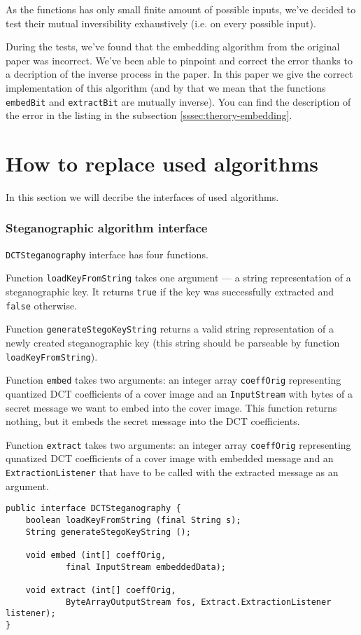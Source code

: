 As the functions has only small finite amount of possible inputs, we've decided
to test their mutual inversibility exhaustively (i.e. on every possible input).

During the tests, we've found that the embedding algorithm from the original
paper \cite{liu2008high} was incorrect. We've been able to pinpoint and correct
the error thanks to a decription of the inverse process in the paper. In this 
paper we give the correct implementation of this algorithm (and by that we mean
that the functions \texttt{embedBit} and \texttt{extractBit} are mutually inverse).
You can find the description of the error in the listing in the subsection \ref{sssec:therory-embedding}.

\section{How to replace used algorithms}
In this section we will decribe the interfaces of used algorithms.

\subsubsection{Steganographic algorithm interface}
\texttt{DCTSteganography} interface has four functions.

Function \texttt{loadKeyFromString} takes one argument --- 
a string representation of a steganographic key. It returns
\texttt{true} if the key was successfully extracted and
\texttt{false} otherwise.

Function \texttt{generateStegoKeyString} returns a 
valid string representation of a newly created steganographic key 
(this string should be parseable by function \texttt{loadKeyFromString}).

Function \texttt{embed} takes two arguments: an integer array \texttt{coeffOrig}
representing quantized DCT coefficients of a cover image and an \texttt{InputStream} 
with bytes of a secret message we want to embed into the cover image. 
This function returns nothing, but it embeds the secret message into
the DCT coefficients. 

Function \texttt{extract} takes two arguments: an integer array \texttt{coeffOrig}
representing qunatized DCT coefficients of a cover image with embedded message
and an \texttt{ExtractionListener} that have to be called with the extracted message
as an argument.

\begin{lstlisting} 
public interface DCTSteganography {
    boolean loadKeyFromString (final String s);
    String generateStegoKeyString ();

    void embed (int[] coeffOrig, 
            final InputStream embeddedData);

    void extract (int[] coeffOrig,  
            ByteArrayOutputStream fos, Extract.ExtractionListener listener);
}
\end{lstlisting}

